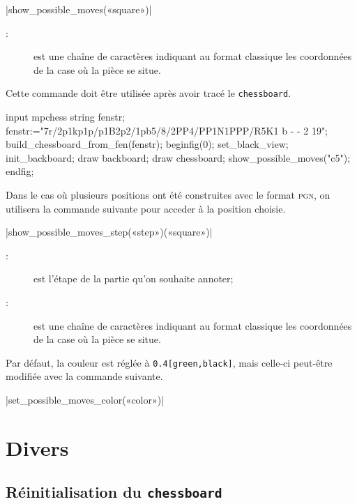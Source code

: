 \documentclass[french]{ltxdoc}
\begin{document}
\commande|show_possible_moves(«square»)|\smallskip

\begin{description}
\item[:] est une chaîne de caractères indiquant au format classique
les coordonnées de la case où la pièce se situe. 
\end{description}

Cette commande doit être utilisée après avoir tracé le \lstinline+chessboard+. 

\begin{ExempleMP}
  input mpchess
  string fenstr;
  fenstr:="7r/2p1kp1p/p1B2p2/1pb5/8/2PP4/PP1N1PPP/R5K1 b - - 2 19";
  build_chessboard_from_fen(fenstr);
  beginfig(0);
  set_black_view;
  init_backboard;
  draw backboard;
  draw chessboard;
  show_possible_moves("c5");
  endfig;
\end{ExempleMP}  

Dans le cas où plusieurs positions ont été construites avec le format
\textsc{pgn}, on utilisera la commande suivante pour acceder à la position
choisie. 

\commande|show_possible_moves_step(«step»)(«square»)|\smallskip

\begin{description}
  \item[:] est l’étape de la partie qu’on souhaite annoter; 
\item[:] est une chaîne de caractères indiquant au format classique
les coordonnées de la case où la pièce se situe. 
\end{description}

Par défaut, la couleur est réglée à \lstinline+0.4[green,black]+, mais celle-ci
peut-être modifiée avec la commande suivante. 

\commande|set_possible_moves_color(«color»)|\smallskip


\section{Divers}

\subsection{Réinitialisation du \lstinline+chessboard+}
\end{document}

